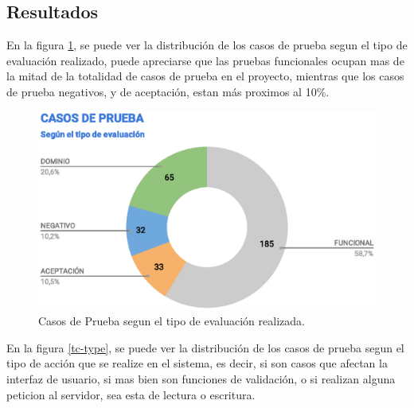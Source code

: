 \begin{description}
%
\end{description}

\subsection{Resultados}
En la figura \ref{tc-tests}, se puede ver la distribución de los casos de prueba
segun el tipo de evaluación realizado, puede apreciarse que las pruebas
funcionales ocupan mas de la mitad de la totalidad de casos de prueba en el
proyecto, mientras que los casos de prueba negativos, y de aceptación, estan más
proximos al 10\%.

\begin{figure}
\centering
\includegraphics[width=1.0\textwidth]{graphics/tc-tests.eps}
\caption{Casos de Prueba segun el tipo de evaluación realizada.}
\label{tc-tests}
\end{figure}

En la figura \ref{tc-type}, se puede ver la distribución de los casos de prueba
segun el tipo de acción que se realize en el sistema, es decir, si son casos
que afectan la interfaz de usuario, si mas bien son funciones de validación, o
si realizan alguna peticion al servidor, sea esta de lectura o escritura.

